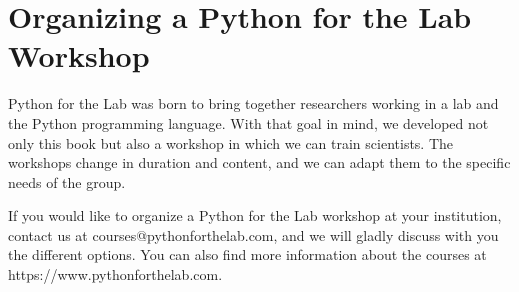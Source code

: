 \section{Organizing a Python for the Lab Workshop}\label{sec:organizing-a-python-for-the-lab-workshop}
Python for the Lab was born to bring together researchers working in a lab and the Python programming language. With that goal in mind, we developed not only this book but also a workshop in which we can train scientists. The workshops change in duration and content, and we can adapt them to the specific needs of the group.

If you would like to organize a Python for the Lab workshop at your institution, contact us at courses@pythonforthelab.com, and we will gladly discuss with you the different options. You can also find more information about the courses at https://www.pythonforthelab.com.

